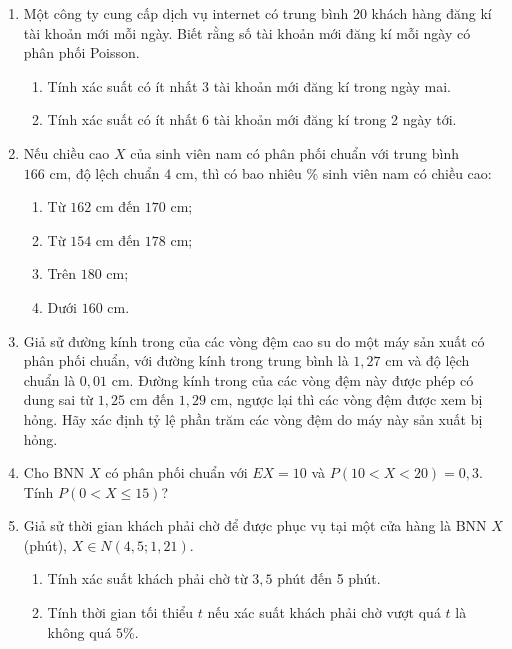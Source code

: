 \begin{enumerate}[label=\textbf{\arabic*.}]
    \item Một công ty cung cấp dịch vụ internet có trung bình 20 khách hàng đăng kí tài khoản mới mỗi ngày. Biết rằng số tài khoản mới đăng kí mỗi ngày có phân phối Poisson.
    \begin{enumerate}[label=\alph*)]
        \item Tính xác suất có ít nhất 3 tài khoản mới đăng kí trong ngày mai.
        \item Tính xác suất có ít nhất 6 tài khoản mới đăng kí trong 2 ngày tới.
    \end{enumerate}

    \item Nếu chiều cao $X$ của sinh viên nam có phân phối chuẩn với trung bình $166\text{ cm}$, độ lệch chuẩn $4\text{ cm}$, thì có bao nhiêu $\%$ sinh viên nam có chiều cao:
    \begin{enumerate}[label=(\arabic*)]
        \item Từ $162\text{ cm}$ đến $170\text{ cm}$;
        \item Từ $154\text{ cm}$ đến $178\text{ cm}$;
        \item Trên $180\text{ cm}$;
        \item Dưới $160\text{ cm}$.
    \end{enumerate}

    \item Giả sử đường kính trong của các vòng đệm cao su do một máy sản xuất có phân phối chuẩn, với đường kính trong trung bình là $1{,}27\text{ cm}$ và độ lệch chuẩn là $0{,}01\text{ cm}$. Đường kính trong của các vòng đệm này được phép có dung sai từ $1{,}25\text{ cm}$ đến $1{,}29\text{ cm}$, ngược lại thì các vòng đệm được xem bị hỏng. Hãy xác định tỷ lệ phần trăm các vòng đệm do máy này sản xuất bị hỏng.

    \item Cho BNN $X$ có phân phối chuẩn với $EX = 10$ và $P(10 < X < 20) = 0{,}3$. Tính $P(0 < X \le 15)$?

    \item Giả sử thời gian khách phải chờ để được phục vụ tại một cửa hàng là BNN $X$ (phút), $X \in N(4{,}5; 1{,}21)$.
    \begin{enumerate}[label=\arabic*)]
        \item Tính xác suất khách phải chờ từ $3{,}5$ phút đến 5 phút.
        \item Tính thời gian tối thiểu $t$ nếu xác suất khách phải chờ vượt quá $t$ là không quá $5\%$.
    \end{enumerate}


\end{enumerate}
